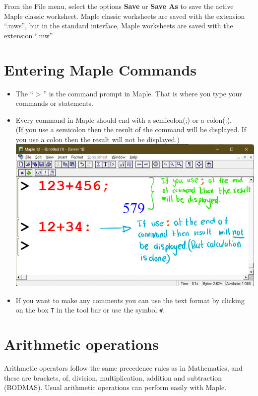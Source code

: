 \documentclass[
]{book}
\providecommand{\tightlist}{%
  \setlength{\itemsep}{0pt}\setlength{\parskip}{0pt}}
\theoremstyle{definition}
\theoremstyle{definition}
\theoremstyle{definition}
\theoremstyle{definition}
\theoremstyle{remark}
\begin{document}
From the File menu, select the options \textbf{Save} or \textbf{Save As} to save the active Maple classic worksheet.
Maple classic worksheets are saved with the extension ``.mws'', but in the standard interface, Maple worksheets are saved with the extension ``.mw''

\section{Entering Maple Commands}\label{entering-maple-commands-1}

\begin{itemize}
\tightlist
\item
  The `` \textgreater{} '' is the command prompt in Maple. That is where you type your commands or statements.
\item
  Every command in Maple should end with a semicolon(;) or a colon(:).\\
  (If you use a semicolon then the result of the command will be displayed. If you use a colon then the result will not be displayed.)
  \includegraphics{figures/Lesson 1/fig3.png}
\item
  If you want to make any comments you can use the text format by clicking on the box \texttt{T} in the tool bar or use the symbol \texttt{\#}.
\end{itemize}

\section{Arithmetic operations}\label{arithmetic-operations-1}

Arithmetic operators follow the same precedence rules as in Mathematics, and these are brackets, of, division, multiplication, addition and subtraction (BODMAS). Usual arithmetic operations can perform easily with Maple.
\end{document}
